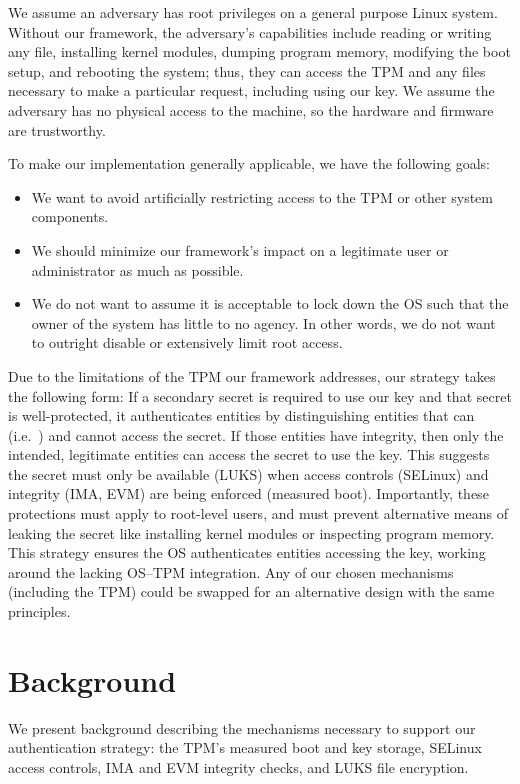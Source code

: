 \documentclass[12pt,letterpaper]{kuthesis}
\begin{document}
We assume an adversary has root privileges on a general purpose Linux system.
Without our framework, the adversary's capabilities include reading or writing any file,
installing kernel modules, dumping program memory, modifying the boot setup, and rebooting the system;
thus, they can access the TPM and any files necessary to make a particular request, including using our key.
We assume the adversary has no physical access to the machine, so the hardware and firmware are trustworthy.

To make our implementation generally applicable, we have the following goals:
\begin{itemize}
\item We want to avoid artificially restricting access to the TPM or other system components.
\item We should minimize our framework's impact on a legitimate user or administrator as much as possible.
\item We do not want to assume it is acceptable to lock down the OS such that the owner of the system has little to no agency.
In other words, we do not want to outright disable or extensively limit root access.
\end{itemize}

Due to the limitations of the TPM our framework addresses, our strategy takes the following form:
If a secondary secret is required to use our key and that secret is well-protected,
it authenticates entities by distinguishing entities that can (i.e.\ \tpmsign) and cannot access the secret.
If those entities have integrity, then only the intended, legitimate entities can access the secret to use the key.
This suggests the secret must only be available (LUKS) when access controls (SELinux) and integrity (IMA, EVM) are being enforced (measured boot).
Importantly, these protections must apply to root-level users,
and must prevent alternative means of leaking the secret like installing kernel modules or inspecting program memory.
This strategy ensures the OS authenticates entities accessing the key, working around the lacking OS--TPM integration.
Any of our chosen mechanisms (including the TPM) could be swapped for an alternative design with the same principles.

\section{Background}\label{sec:background}
We present background describing the mechanisms necessary to support our authentication strategy: the TPM's measured boot and key storage, SELinux access controls, IMA and EVM integrity checks, and LUKS file encryption.
\end{document}
